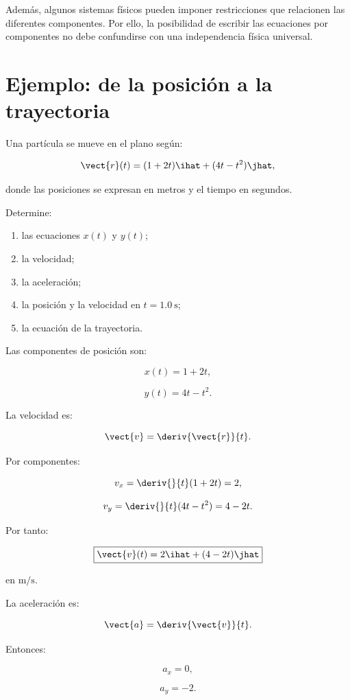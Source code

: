 Además, algunos sistemas físicos pueden imponer restricciones que relacionen
las diferentes componentes. Por ello, la posibilidad de escribir las ecuaciones
por componentes no debe confundirse con una independencia física universal.


\section{Ejemplo: de la posición a la trayectoria}

\begin{ejemplo}
Una partícula se mueve en el plano según:

\[
\vect{r}(t)
=
(1+2t)\ihat
+
(4t-t^2)\jhat,
\]

donde las posiciones se expresan en metros y el tiempo en segundos.

Determine:

\begin{enumerate}[label=\alph*)]
    \item las ecuaciones \(x(t)\) y \(y(t)\);
    \item la velocidad;
    \item la aceleración;
    \item la posición y la velocidad en \(t=\SI{1.0}{\second}\);
    \item la ecuación de la trayectoria.
\end{enumerate}
\end{ejemplo}

Las componentes de posición son:

\[
x(t)=1+2t,
\]

\[
y(t)=4t-t^2.
\]

La velocidad es:

\[
\vect{v}
=
\deriv{\vect{r}}{t}.
\]

Por componentes:

\[
v_x
=
\deriv{}{t}(1+2t)
=
2,
\]

\[
v_y
=
\deriv{}{t}(4t-t^2)
=
4-2t.
\]

Por tanto:

\[
\boxed{
\vect{v}(t)
=
2\ihat+(4-2t)\jhat
}
\]

en \(\si{\meter\per\second}\).

La aceleración es:

\[
\vect{a}
=
\deriv{\vect{v}}{t}.
\]

Entonces:

\[
a_x=0,
\]

\[
a_y=-2.
\]

